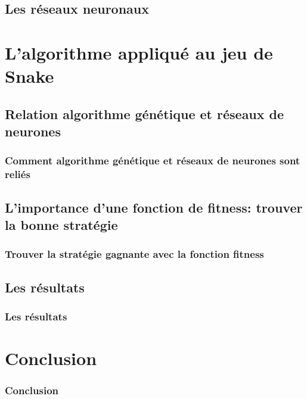 \documentclass[10pt]{beamer}
\begin{document}
  \subsection{Les réseaux neuronaux}
  

\section{L'algorithme appliqué au jeu de Snake}

\subsection{Relation algorithme génétique et réseaux de neurones}

\begin{frame}
  \frametitle{Comment algorithme génétique et réseaux de neurones sont reliés}
  
\end{frame}

\subsection{L'importance d'une fonction de fitness: trouver la bonne stratégie}

\begin{frame}
  \frametitle{Trouver la stratégie gagnante avec la fonction fitness}
\end{frame}

\subsection{Les résultats}

\begin{frame}
  \frametitle{Les résultats}
\end{frame}

\section{Conclusion}

\begin{frame}
  \frametitle{Conclusion}
\end{frame}
\end{document}
